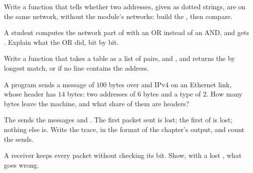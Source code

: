 \begin{exercise}[$\star$]\label{exo:g11:network-protocols:5}
Write a function  that tells whether two addresses, given as dotted strings, are on
the same network, without the  module's networks: build the , then compare.
\end{exercise}

\begin{exercise}[$\star\star$]\label{exo:g11:network-protocols:6}
A student computes the network part of  with an OR instead of an AND, and gets
. Explain what the OR did, bit by bit.
\end{exercise}

\begin{exercise}[$\star\star$]\label{exo:g11:network-protocols:7}
Write a function  that takes a table as a list of pairs,  and , and
returns the  by longest  match, or  if no line contains the address.
\end{exercise}

\begin{exercise}[$\star\star$]\label{exo:g11:network-protocols:8}
A program sends a message of $100$ bytes over  and IPv4 on an Ethernet link, whose header has $14$ bytes:
two addresses of $6$ bytes and a type of $2$. How many bytes leave the machine, and what share of them are headers?
\end{exercise}

\begin{exercise}[$\star\star$]\label{exo:g11:network-protocols:9}
The  sends the messages  and . The first packet sent is lost; the first
 of  is lost; nothing else is. Write the trace, in the format of the chapter's output, and count
the sends.
\end{exercise}

\begin{exercise}[$\star\star$]\label{exo:g11:network-protocols:10}
A receiver keeps every packet without checking its bit. Show, with a lost , what goes wrong.
\end{exercise}

